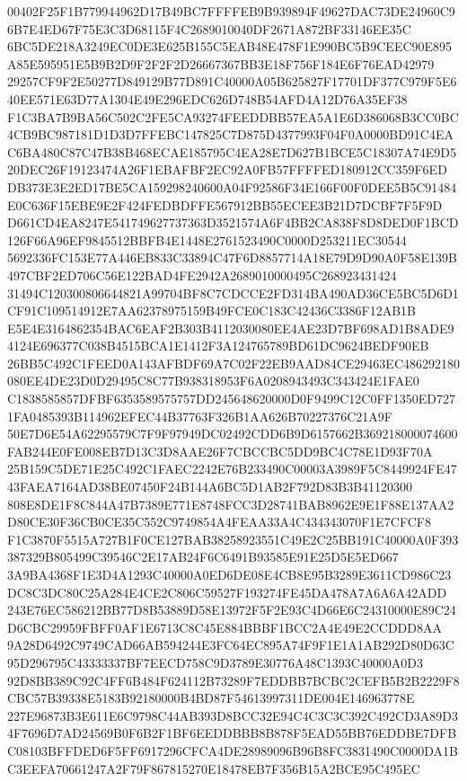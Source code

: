\documentclass[UTF8,fontset=fandol,zihao=-4,a4paper]{ctexart}
\begin{document}
{{00402F25F1B779944962D17B49BC7FFFFEB9B939894F49627DAC73DE24960C96B7E4ED67F75E3C3D68115F4C2689010040DF2671A872BF33146EE35C
6BC5DE218A3249EC0DE3E625B155C5EAB48E478F1E990BC5B9CEEC90E895A85E595951E5B9B2D9F2F2F2D26667367BB3E18F756F184E6F76EAD42979
29257CF9F2E50277D849129B77D891C40000A05B625827F17701DF377C979F5E640EE571E63D77A1304E49E296EDC626D748B54AFD4A12D76A35EF38
F1C3BA7B9BA56C502C2FE5CA93274FEEDDBB57EA5A1E6D386068B3CC0BC4CB9BC987181D1D3D7FFEBC147825C7D875D4377993F04F0A0000BD91C4EA
C6BA480C87C47B38B468ECAE185795C4EA28E7D627B1BCE5C18307A74E9D520DEC26F19123474A26F1EBAFBF2EC92A0FB57FFFFED180912CC359F6ED
DB373E3E2ED17BE5CA159298240600A04F92586F34E166F00F0DEE5B5C91484E0C636F15EBE9E2F424FEDBDFFE567912BB55ECEE3B21D7DCBF7F5F9D
D661CD4EA8247E541749627737363D3521574A6F4BB2CA838F8D8DED0F1BCD126F66A96EF9845512BBFB4E1448E2761523490C0000D253211EC30544
5692336FC153E77A446EB833C33894C47F6D8857714A18E79D9D90A0F58E139B497CBF2ED706C56E122BAD4FE2942A2689010000495C268923431424
31494C120300806644821A99704BF8C7CDCCE2FD314BA490AD36CE5BC5D6D1CF91C109514912E7AA62378975159B49FCE0C183C42436C3386F12AB1B
E5E4E3164862354BAC6EAF2B303B4112030080EE4AE23D7BF698AD1B8ADE94124E696377C038B4515BCA1E1412F3A124765789BD61DC9624BEDF90EB
26BB5C492C1FEED0A143AFBDF69A7C02F22EB9AAD84CE29463EC486292180080EE4DE23D0D29495C8C77B938318953F6A0208943493C343424E1FAE0
C1838585857DFBF6353589575757DD245648620000D0F9499C12C0FF1350ED7271FA0485393B114962EFEC44B37763F326B1AA626B70227376C21A9F
50E7D6E54A62295579C7F9F97949DC02492CDD6B9D6157662B369218000074600FAB244E0FE008EB7D13C3D8AAE26F7CBCCBC5DD9BC4C78E1D93F70A
25B159C5DE71E25C492C1FAEC2242E76B233490C00003A3989F5C8449924FE4743FAEA7164AD38BE07450F24B144A6BC5D1AB2F792D83B3B41120300
808E8DE1F8C844A47B7389E771E8748FCC3D28741BAB8962E9E1F88E137AA2D80CE30F36CB0CE35C552C9749854A4FEAA33A4C434343070F1E7CFCF8
F1C3870F5515A727B1F0CE127BAB38258923551C49E2C25BB191C40000A0F393387329B805499C39546C2E17AB24F6C6491B93585E91E25D5E5ED667
3A9BA4368F1E3D4A1293C40000A0ED6DE08E4CB8E95B3289E3611CD986C23DC8C3DC80C25A284E4CE2C806C59527F193274FE45DA478A7A6A6A42ADD
243E76EC586212BB77D8B53889D58E13972F5F2E93C4D66E6C24310000E89C24D6CBC29959FBFF0AF1E6713C8C45E884BBBF1BCC2A4E49E2CCDDD8AA
9A28D6492C9749CAD66AB594244E3FC64EC895A74F9F1E1A1AB292D80D63C95D296795C43333337BF7EECD758C9D3789E30776A48C1393C40000A0D3
92D8BB389C92C4FF6B484F624112B73289F7EDDBB7BCBC2CEFB5B2B2229F8CBC57B39338E5183B92180000B4BD87F54613997311DE004E146963778E
227E96873B3E611E6C9798C44AB393D8BCC32E94C4C3C3C392C492CD3A89D34F7696D7AD24569B0F6B2F1BF6EEDDBBB8B878F5EAD55BB76EDDBE7DFB
C08103BFFDED6F5FF6917296CFCA4DE28989096B96B8FC3831490C0000DA1BC3EEFA70661247A2F79F867815270E18478EB7F356B15A2BCE95C495EC
}}
\end{document}

